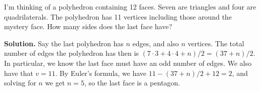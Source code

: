 \documentclass{book}
\begin{document}
\setcounter{project}{33}
\addtocounter{project}{-1}
\begin{activity}[]\label{activity-28}
\hypertarget{p-326}{}%
I'm thinking of a polyhedron containing 12 faces. Seven are triangles and four are quadrilaterals. The polyhedron has 11 vertices including those around the mystery face. How many sides does the last face have?%
\par\smallskip%
\noindent\textbf{Solution.}\hypertarget{solution-28}{}\quad%
\hypertarget{p-327}{}%
Say the last polyhedron has \(n\) edges, and also \(n\) vertices. The total number of edges the polyhedron has then is \((7 \cdot 3 + 4 \cdot 4 + n)/2 = (37 + n)/2\). In particular, we know the last face must have an odd number of edges. We also have that \(v = 11 \).  By Euler's formula, we have \(11 - (37+n)/2 + 12 = 2\), and solving for \(n\) we get \(n = 5\), so the last face is a pentagon.%
\end{activity}
\end{document}
